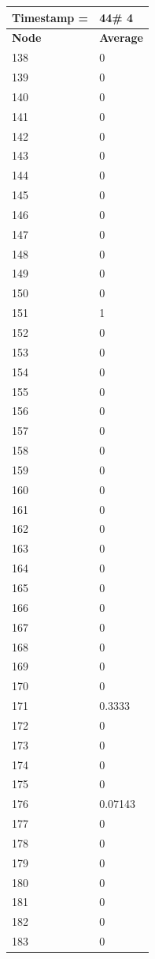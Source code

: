 \begin{tabular}{|l||l|}
\hline
\textbf{Timestamp =} & \textbf{44}\# 4\\\hline
	\textbf{Node} & \textbf{Average} \\ \hline
\hline
	138 & 0 \\ \hline
	139 & 0 \\ \hline
	140 & 0 \\ \hline
	141 & 0 \\ \hline
	142 & 0 \\ \hline
	143 & 0 \\ \hline
	144 & 0 \\ \hline
	145 & 0 \\ \hline
	146 & 0 \\ \hline
	147 & 0 \\ \hline
	148 & 0 \\ \hline
	149 & 0 \\ \hline
	150 & 0 \\ \hline
	151 & 1 \\ \hline
	152 & 0 \\ \hline
	153 & 0 \\ \hline
	154 & 0 \\ \hline
	155 & 0 \\ \hline
	156 & 0 \\ \hline
	157 & 0 \\ \hline
	158 & 0 \\ \hline
	159 & 0 \\ \hline
	160 & 0 \\ \hline
	161 & 0 \\ \hline
	162 & 0 \\ \hline
	163 & 0 \\ \hline
	164 & 0 \\ \hline
	165 & 0 \\ \hline
	166 & 0 \\ \hline
	167 & 0 \\ \hline
	168 & 0 \\ \hline
	169 & 0 \\ \hline
	170 & 0 \\ \hline
	171 & 0.3333 \\ \hline
	172 & 0 \\ \hline
	173 & 0 \\ \hline
	174 & 0 \\ \hline
	175 & 0 \\ \hline
	176 & 0.07143 \\ \hline
	177 & 0 \\ \hline
	178 & 0 \\ \hline
	179 & 0 \\ \hline
	180 & 0 \\ \hline
	181 & 0 \\ \hline
	182 & 0 \\ \hline
	183 & 0 \\ \hline
\end{tabular}
